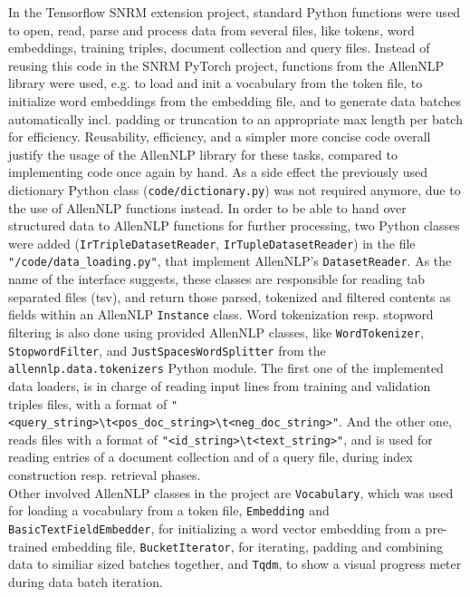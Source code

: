 In the Tensorflow SNRM extension project, standard Python functions were used 
    to open, read, parse and process data from several files, 
    like tokens, word embeddings, training triples, document collection 
    and query files.
Instead of reusing this code in the SNRM PyTorch project, functions from the
    AllenNLP library were used, e.g. to load and init a vocabulary from the token file,
    to initialize word embeddings from the embedding file,
    and to generate data batches automatically incl. padding or truncation 
    to an appropriate max length per batch for efficiency.
Reusability, efficiency, and a simpler more concise code overall justify the usage of the 
    AllenNLP library for these tasks, compared to implementing code once again by hand.
As a side effect the previously used dictionary Python class (\texttt{code/dictionary.py}) was not
    required anymore, due to the use of AllenNLP functions instead.
In order to be able to hand over structured data to AllenNLP functions for further processing, 
    two Python classes were added (\texttt{IrTripleDatasetReader}, \texttt{IrTupleDatasetReader})
    in the file \texttt{"/code/data\_loading.py"}, that implement AllenNLP's \texttt{DatasetReader}.
As the name of the interface suggests, these classes are responsible for reading tab separated files (tsv),
    and return those parsed, tokenized and filtered contents as fields within an AllenNLP \texttt{Instance} class.
Word tokenization resp. stopword filtering is also done using provided AllenNLP classes, 
    like \texttt{WordTokenizer}, \texttt{StopwordFilter}, and \texttt{JustSpacesWordSplitter} from the
    \texttt{allennlp.data.tokenizers} Python module.
The first one of the implemented data loaders, is in charge of reading input lines from training and validation
    triples files, with a format of \verb|"<query_string>\t<pos_doc_string>\t<neg_doc_string>"|.
And the other one, reads files with a format of \verb|"<id_string>\t<text_string>"|, and is used for
    reading entries of a document collection and of a query file, during index construction resp. 
    retrieval phases.\\
Other involved AllenNLP classes in the project are \texttt{Vocabulary}, which was used for loading 
    a vocabulary from a token file, \texttt{Embedding} and \texttt{BasicTextFieldEmbedder}, 
    for initializing a word vector embedding from a pre-trained embedding file,
    \texttt{BucketIterator}, for iterating, padding and combining data to similiar sized batches together,
    and \texttt{Tqdm}, to show a visual progress meter during data batch iteration.
